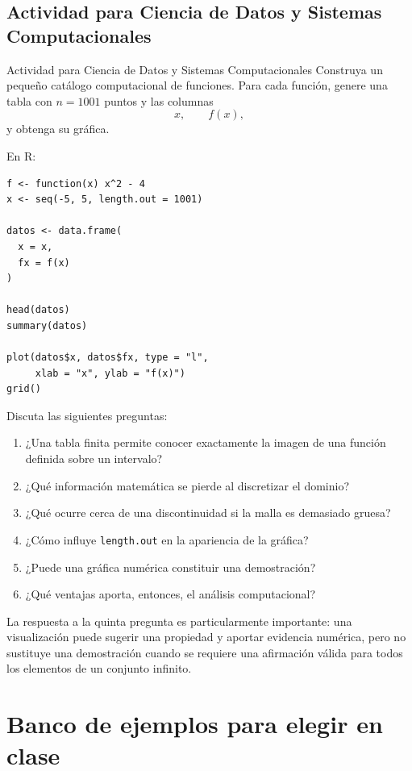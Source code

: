\documentclass[aspectratio=169,10pt]{beamer}
\begin{document}
\subsection{Actividad para Ciencia de Datos y Sistemas Computacionales}
\begin{frame}{Actividad para Ciencia de Datos y Sistemas Computacionales}
Construya un pequeño catálogo computacional de funciones. Para cada función,
genere una tabla con $n=1001$ puntos y las columnas
\[
x,\qquad f(x),
\]
y obtenga su gráfica.

En R:

\begin{verbatim}
f <- function(x) x^2 - 4
x <- seq(-5, 5, length.out = 1001)

datos <- data.frame(
  x = x,
  fx = f(x)
)

head(datos)
summary(datos)

plot(datos$x, datos$fx, type = "l",
     xlab = "x", ylab = "f(x)")
grid()
\end{verbatim}

Discuta las siguientes preguntas:

\begin{enumerate}
    \item ¿Una tabla finita permite conocer exactamente la imagen de una
    función definida sobre un intervalo?
    \item ¿Qué información matemática se pierde al discretizar el dominio?
    \item ¿Qué ocurre cerca de una discontinuidad si la malla es demasiado
    gruesa?
    \item ¿Cómo influye \texttt{length.out} en la apariencia de la gráfica?
    \item ¿Puede una gráfica numérica constituir una demostración?
    \item ¿Qué ventajas aporta, entonces, el análisis computacional?
\end{enumerate}

La respuesta a la quinta pregunta es particularmente importante: una
visualización puede sugerir una propiedad y aportar evidencia numérica, pero
no sustituye una demostración cuando se requiere una afirmación válida para
todos los elementos de un conjunto infinito.
\end{frame}
\section{Banco de ejemplos para elegir en clase}
\end{document}
